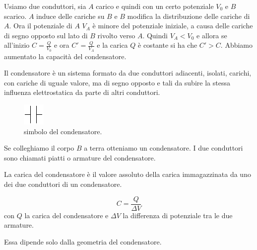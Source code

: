 Usiamo due conduttori, sia $A$ carico e quindi con un certo potenziale $V_0$ e $B$ scarico. $A$ induce delle cariche su $B$ e $B$ modifica la distribuzione delle cariche di $A$. Ora il potenziale di $A$ $V_A$ è minore del potenziale iniziale, a causa delle cariche di segno opposto sul lato di $B$ rivolto verso $A$. Quindi $V_A<V_0$ e allora se all'inizio $C=\frac{Q}{V_0}$ e ora $C'=\frac{Q}{V_A}$ e la carica $Q$ è costante si ha che $C'>C$. Abbiamo aumentato la capacità del condensatore.
\begin{Def}[condensatore]
  Il condensatore è un sistema formato da due conduttori adiacenti, isolati, carichi, con cariche di uguale valore, ma di segno opposto e tali da subire la stessa influenza elettrostatica da parte di altri conduttori.
\end{Def}
\begin{figure}[htbp]
  \centering
  \includegraphics[scale=1.5]{immagini/fisica2/cond1}
  \caption{simbolo del condensatore.}
\end{figure}
Se colleghiamo il corpo $B$ a terra otteniamo un condensatore. I due conduttori sono chiamati piatti o armature del condensatore.
\begin{Def}
  La carica del condensatore è il valore assoluto della carica immagazzinata da uno dei due conduttori di un condensatore.
\end{Def}
\begin{Def}
  \[C=\frac{Q}{\Delta V}\]
  con $Q$ la carica del condensatore e $\Delta V$ la differenza di potenziale tra le due armature.
\end{Def}
Essa dipende solo dalla geometria del condensatore.

